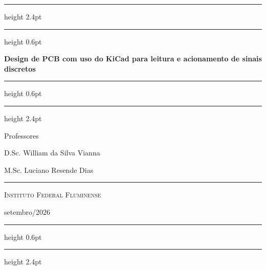 \begin{titlepage}
  \centering
  \vspace*{2.3cm}

  {\color{azulCap}\hrule height 2.4pt}
  \vspace{2.4pt}
  {\color{azulSub}\hrule height 0.6pt}

  \vspace{1.8cm}
  {\color{azulCap}\huge\bfseries Design de PCB com uso do KiCad para leitura e acionamento de sinais discretos\par}
  \vspace{1.3cm}

  {\color{azulSub}\hrule height 0.6pt}
  \vspace{2.4pt}
  {\color{azulCap}\hrule height 2.4pt}

  \vfill

  {\large Professores\par}
  \vspace{0.5cm}
  {\large D.Sc. William da Silva Vianna\par}
  {\large M.Sc. Luciano Resende Dias\par}

  \vspace{1.4cm}
  {\color{azulSub}\rule{0.42\linewidth}{0.9pt}}
  \vspace{1.4cm}

  {\Large\scshape\color{azulCap} Instituto Federal Fluminense\par}
  \vspace{0.35cm}
  {\large\color{azulSec} setembro/2026\par}

  \vfill

  {\color{azulSub}\hrule height 0.6pt}
  \vspace{2.4pt}
  {\color{azulCap}\hrule height 2.4pt}
\end{titlepage}
